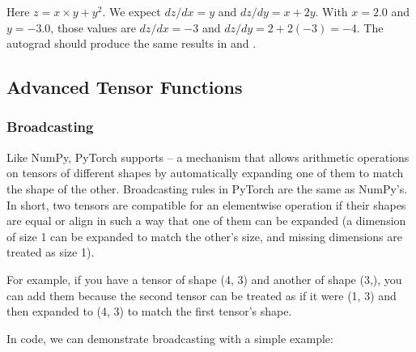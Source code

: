 \documentclass[letterpaper,10pt,english]{jupyterBook}
\begin{document}
\sphinxAtStartPar
Here \( z = x \times y + y^2 \). We expect \( dz/dx = y \) and \( dz/dy = x + 2y \). With \( x = 2.0 \) and \( y = -3.0 \), those values are \( dz/dx = -3 \) and \( dz/dy = 2 + 2(-3) = -4 \). The autograd should produce the same results in  and .


\subsection{Advanced Tensor Functions}
\label{\detokenize{04:advanced-tensor-functions}}

\subsubsection{Broadcasting}
\label{\detokenize{04:broadcasting}}
\sphinxAtStartPar
Like NumPy, PyTorch supports  – a mechanism that allows arithmetic operations on tensors of different shapes by automatically expanding one of them to match the shape of the other. Broadcasting rules in PyTorch are the same as NumPy’s. In short, two tensors are compatible for an elementwise operation if their shapes are equal or align in such a way that one of them can be expanded (a dimension of size 1 can be expanded to match the other’s size, and missing dimensions are treated as size 1).

\sphinxAtStartPar
For example, if you have a tensor of shape (4, 3) and another of shape (3,), you can add them because the second tensor can be treated as if it were (1, 3) and then expanded to (4, 3) to match the first tensor’s shape.

\sphinxAtStartPar
In code, we can demonstrate broadcasting with a simple example:
\end{document}
